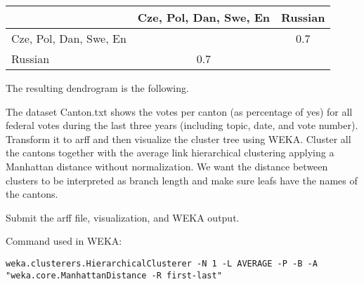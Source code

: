 \documentclass[fontsize=12pt, usenames, dvipsnames, headinclude, headsepline, footinclude, footsepline]{scrartcl}
\begin{document}
\begin{sol}
\begin{enumerate}
      \begin{center}
        \begin{tabular}{@{}l|cc@{}}
          \toprule
          & Cze, Pol, Dan, Swe, En & Russian \\ \midrule
          Cze, Pol, Dan, Swe, En &                        & 0.7     \\
          Russian                & 0.7                    &         \\ \bottomrule
        \end{tabular}
      \end{center}

      The resulting dendrogram is the following.

      \begin{center}
      \end{center}
    \end{enumerate}
  \end{sol}




\begin{exo}
  The dataset Canton.txt shows the votes per canton (as percentage of yes) for all federal votes during the
  last three years (including topic, date, and vote number). Transform it to arff and then visualize the
  cluster tree using WEKA. Cluster all the cantons together with the average link hierarchical clustering
  applying a Manhattan distance without normalization. We want the distance between clusters to be interpreted
  as branch length and make sure leafs have the names of the cantons.  

  Submit the arff file, visualization, and WEKA output.
\end{exo}

\begin{sol}
  Command used in WEKA:
{\scriptsize
\begin{verbatim}
weka.clusterers.HierarchicalClusterer -N 1 -L AVERAGE -P -B -A "weka.core.ManhattanDistance -R first-last"
\end{verbatim}
}
\end{sol}
\end{document}
